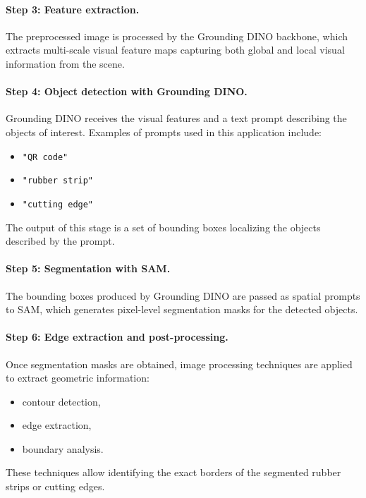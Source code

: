 \documentclass[11pt]{article}
\begin{document}
\paragraph{Step 3: Feature extraction.}
The preprocessed image is processed by the Grounding DINO backbone, which extracts 
multi-scale visual feature maps capturing both global and local visual information from 
the scene.

\paragraph{Step 4: Object detection with Grounding DINO.}
Grounding DINO receives the visual features and a text prompt describing the objects 
of interest. Examples of prompts used in this application include:
\begin{itemize}
    \item \texttt{"QR code"}
    \item \texttt{"rubber strip"}
    \item \texttt{"cutting edge"}
\end{itemize}
The output of this stage is a set of bounding boxes localizing the objects described 
by the prompt.

\paragraph{Step 5: Segmentation with SAM.}
The bounding boxes produced by Grounding DINO are passed as spatial prompts to SAM, 
which generates pixel-level segmentation masks for the detected objects.

\paragraph{Step 6: Edge extraction and post-processing.}
Once segmentation masks are obtained, image processing techniques are applied to 
extract geometric information:
\begin{itemize}
    \item contour detection,
    \item edge extraction,
    \item boundary analysis.
\end{itemize}
These techniques allow identifying the exact borders of the segmented rubber strips 
or cutting edges.
\end{document}

